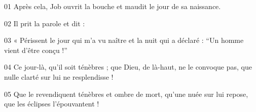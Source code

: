 01 Après cela, Job ouvrit la bouche et maudit le jour de sa naissance.

02 Il prit la parole et dit :

03 « Périssent le jour qui m’a vu naître et la nuit qui a déclaré : “Un homme vient d’être conçu !”

04 Ce jour-là, qu’il soit ténèbres ; que Dieu, de là-haut, ne le convoque pas, que nulle clarté sur lui ne resplendisse !

05 Que le revendiquent ténèbres et ombre de mort, qu’une nuée sur lui repose, que les éclipses l’épouvantent !
